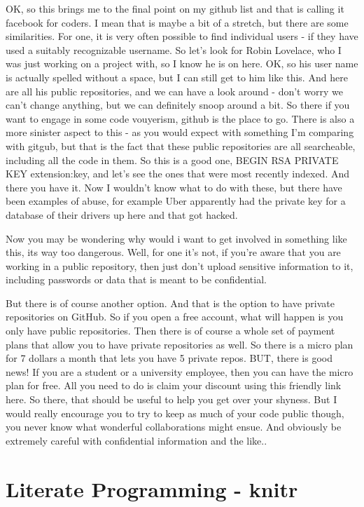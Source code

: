 \documentclass[12pt]{article}
\begin{document}
OK, so this brings me to the final point on my github list and that is calling it facebook for coders. I mean that is maybe a bit of a stretch, but there are some similarities. For one, it is very often possible to find individual users - if they have used a suitably recognizable username. So let's look for Robin Lovelace, who I was just working on a project with, so I know he is on here. OK, so his user name is actually spelled without a space, but I can still get to him like this. And here are all his public repositories, and we can have a look around - don't worry we can't change anything, but we can definitely snoop around a bit. So there if you want to engage in some code vouyerism, github is the place to go. 
There is also a more sinister aspect to this - as you would expect with something I'm comparing with gitgub, but that is the fact that these public repositories are all searcheable, including all the code in them. So this is a good one, BEGIN RSA PRIVATE KEY extension:key, and let's see the ones that were most recently indexed. And there you have it. Now I wouldn't know what to do with these, but there have been examples of abuse, for example Uber apparently had the private key for a database of their drivers up here and that got hacked. 

Now you may be wondering why would i want to get involved in something like this, its way too dangerous. Well, for one it's not, if you're aware that you are working in a public repository, then just don't upload sensitive information to it, including passwords or data that is meant to be confidential. 

But there is of course another option. And that is the option to have private repositories on GitHub. So if you open a free account, what will happen is you only have public repositories. Then there is of course a whole set of payment plans that allow you to have private repositories as well. So there is a micro plan for 7 dollars a month that lets you have 5 private repos. BUT, there is good news! If you are a student or a university employee, then you can have the micro plan for free. All you need to do is claim your discount using this friendly link here. So there, that should be useful to help you get over your shyness. But I would really encourage you to try to keep as much of your code public though, you never know what wonderful collaborations might ensue. And obviously be extremely careful with confidential information and the like.. 

\section{Literate Programming - knitr}
\end{document}

